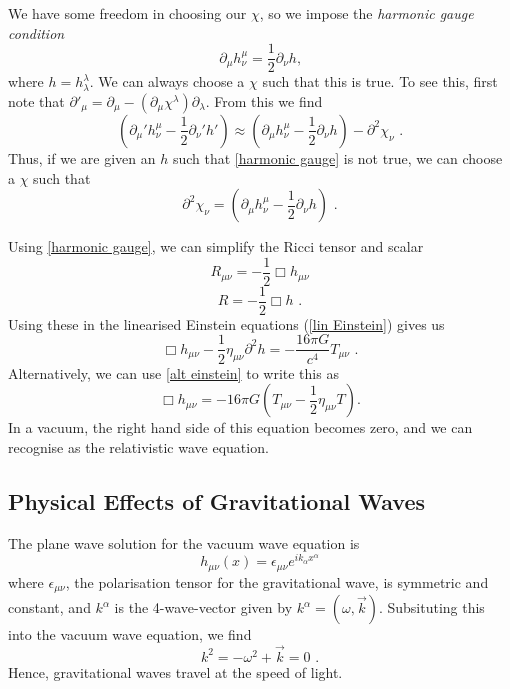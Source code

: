 \documentclass[11pt]{cuthesis}
\newcommand{\mn}{_{\mu\nu}}
\newcommand{\fs}{\text{ .}}
\begin{document}
We have some freedom in choosing our $\chi$, so we impose the \textit{harmonic gauge condition}
\begin{equation} \label{harmonic gauge}
\partial_\mu h^\mu_\nu = \frac{1}{2} \partial_\nu h \text{,}
\end{equation}
where $h=h^\lambda_\lambda$. We can always choose a $\chi$ such that this is true. To see this, first note that $\partial'_\mu = \partial_\mu - (\partial_\mu \chi^\lambda) \partial_\lambda$. From this we find
\begin{equation}
(\partial_\mu' h_\nu^\mu - \frac{1}{2}\partial_\nu' h') \approx (\partial_\mu h^\mu_\nu - \frac{1}{2} \partial_\nu h ) -\partial^2 \chi_\nu \fs
\end{equation}
Thus, if we are given an $h$ such that \ref{harmonic gauge} is not true, we can choose a $\chi$ such that 
\begin{equation} \label{harmonic chi}
\partial^2 \chi_\nu = (\partial_\mu h^\mu_\nu - \frac{1}{2}\partial_\nu h) \fs
\end{equation}

Using \ref{harmonic gauge}, we can simplify the Ricci tensor and scalar
\begin{equation}
R\mn = -\frac{1}{2}\Box h\mn
\end{equation}
\begin{equation}
R=-\frac{1}{2}\Box h \fs
\end{equation}
Using these in the linearised Einstein equations (\ref{lin Einstein}) gives us
\begin{equation}
\Box h\mn - \frac{1}{2}\eta\mn\partial^2 h =-\frac{16\pi G}{c^4}T\mn \fs
\end{equation}
Alternatively, we can use \ref{alt einstein} to write this as
\begin{equation}
\Box h\mn = -16\pi G \left( T\mn -\frac{1}{2} \eta\mn T \right). 
\end{equation}
In a vacuum, the right hand side of this equation becomes zero, and we can recognise as the relativistic wave equation. 

\subsection{Physical Effects of Gravitational Waves}
The plane wave solution for the vacuum wave equation is
\begin{equation} \label{plane wave}
h\mn (x) = \epsilon\mn e^{ik_\alpha x^\alpha} 
\end{equation}
where $\epsilon\mn$, the polarisation tensor for the gravitational wave, is symmetric and constant, and $k^\alpha$ is the 4-wave-vector given by $k^\alpha = (\omega,\vec{k})$. Subsituting this into the vacuum wave equation, we find 
\begin{equation}
k^2 = -\omega^2 + \vec{k} =0 \fs
\end{equation}
Hence, gravitational waves travel at the speed of light. 
\end{document}
